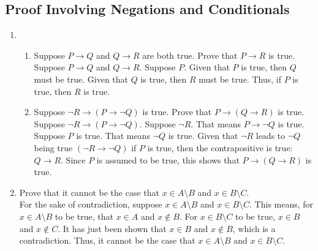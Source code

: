 \documentclass{article}
\begin{document}
\subsection{Proof Involving Negations and Conditionals}
\begin{enumerate}
\item 
    \begin{enumerate}
    \item Suppose $P \rightarrow Q$ and $Q \rightarrow R$ are both true. Prove that $P \rightarrow R$ is true.\\

        \noindent Suppose $P \rightarrow Q$ and $Q \rightarrow R$. Suppose $P$. Given that $P$ is true, then $Q$ must be true. Given that $Q$ is true, then $R$ must be true. Thus, if $P$ is true, then $R$ is true.

    \item Suppose $\lnot R \rightarrow (P \rightarrow \lnot Q)$ is true. Prove that $P \rightarrow (Q \rightarrow R)$ is true.\\

        \noindent Suppose $\lnot R \rightarrow (P \rightarrow \lnot Q)$. Suppose $\lnot R$. That means $P \rightarrow \lnot Q$ is true. Suppose $P$ is true. That means $\lnot Q$ is true. Given that $\lnot R$ leads to $\lnot Q$ being true $(\lnot R \rightarrow \lnot Q)$ if $P$ is true, then the contrapositive is true: $Q \rightarrow R$. Since $P$ is assumed to be true, this shows that $P \rightarrow (Q \rightarrow R)$ is true.
    \end{enumerate}
\setcounter{enumi}{4} 
\item Prove that it cannot be the case that $x \in A \setminus B$ and $x \in B \setminus C$.\\

\noindent For the sake of contradiction, suppose $x \in A \setminus B$ and $x \in B \setminus C$. This means, for $x \in A \setminus B$ to be true, that $x \in A$ and $x \notin B$. For $x \in B \setminus C$ to be true, $x \in B$ and $x \notin C$. It has just been shown that $x \in B$ and $x \notin B$, which is a contradiction. Thus, it cannot be the case that $x \in A \setminus B$ and $x \in B \setminus C$.
\end{enumerate}
\end{document}
